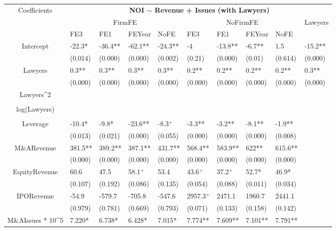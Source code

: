 \documentclass{article}
\begin{document}
\begin{table}[H]
\centering
\begin{tabular}{|clllllllll|}
\hline
\multirow{3}{*}{Coefficients} & \multicolumn{9}{c|}{\textbf{NOI $\sim$ Revenue + Issues (with Lawyers)}} \\
\cline{2-10}
& \multicolumn{4}{c}{FirmFE} & \multicolumn{4}{c}{NoFirmFE} & \multirow{2}{*}{Lawyers} \\
\cline{2-9}
& FE3 & FE1 & FEYear & NoFE & FE3 & FE1 & FEYear & NoFE &  \\
\hline
 
Intercept & -22.3* & -36.4** & -62.1** & -24.3** & -4 & -13.8** & -6.7** & 1.5 & -15.2** \\ 
   & (0.014) & (0.000) & (0.000) & (0.002) & (0.21) & (0.000) & (0.01) & (0.614) & (0.000) \\ 
  Lawyers & 0.3** & 0.3** & 0.3** & 0.3** & 0.2** & 0.2** & 0.2** & 0.2** & 0.3** \\ 
   & (0.000) & (0.000) & (0.000) & (0.000) & (0.000) & (0.000) & (0.000) & (0.000) & (0.000) \\ 
  Lawyers^2 &  &  &  &  &  &  &  &  &  \\ 
   &  &  &  &  &  &  &  &  &  \\ 
  log(Lawyers) &  &  &  &  &  &  &  &  &  \\ 
   &  &  &  &  &  &  &  &  &  \\ 
  Leverage & -10.4* & -9.8* & -23.6** & -8.3$^{+}$ & -3.3** & -3.2** & -8.1** & -1.9** &  \\ 
   & (0.013) & (0.021) & (0.000) & (0.055) & (0.000) & (0.000) & (0.000) & (0.008) &  \\ 
  M\&ARevenue & 381.5** & 389.2** & 387.1** & 431.7** & 568.4** & 583.9** & 622** & 615.6** &  \\ 
   & (0.000) & (0.000) & (0.000) & (0.000) & (0.000) & (0.000) & (0.000) & (0.000) &  \\ 
  EquityRevenue & 60.6 & 47.5 & 58.1$^{+}$ & 53.4 & 43.6$^{+}$ & 37.2$^{+}$ & 52.7* & 46.9* &  \\ 
   & (0.107) & (0.192) & (0.086) & (0.135) & (0.054) & (0.088) & (0.011) & (0.034) &  \\ 
  IPORevenue & -54.9 & -579.7 & -705.8 & -547.6 & 2957.3$^{+}$ & 2471.1 & 1960.7 & 2441.1 &  \\ 
   & (0.979) & (0.781) & (0.669) & (0.793) & (0.071) & (0.133) & (0.158) & (0.142) &  \\ 
  M\&AIssues * 10^5 & 7.220* & 6.738* & 6.428* & 7.015* & 7.774** & 7.609** & 7.101** & 7.791** &  \\ 

\end{tabular}
\end{table}
\end{document}
